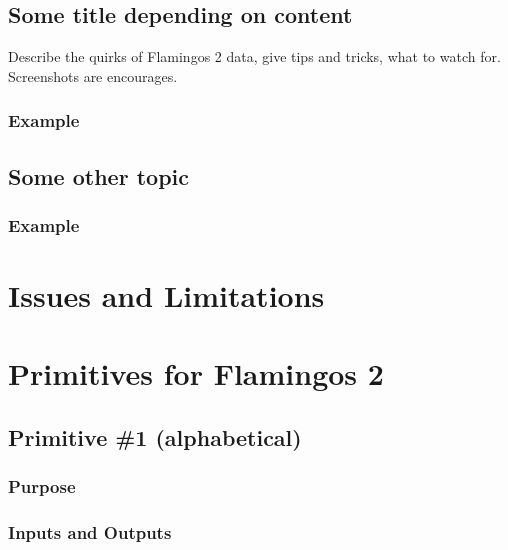 \documentclass[letterpaper,10pt,english]{sphinxmanual}
\begin{document}
\subsection{Some title depending on content}
\label{F2/tipstricks:some-title-depending-on-content}
Describe the quirks of Flamingos 2 data, give tips
and tricks, what to watch for.  Screenshots are encourages.


\subsubsection{Example}
\label{F2/tipstricks:example}

\subsection{Some other topic}
\label{F2/tipstricks:some-other-topic}

\subsubsection{Example}
\label{F2/tipstricks:id1}

\section{Issues and Limitations}
\label{F2/issueslimitations:f2-issues-limitations}\label{F2/issueslimitations::doc}\label{F2/issueslimitations:issues-and-limitations}

\section{Primitives for Flamingos 2}
\label{F2/primitives:f2-primitives}\label{F2/primitives::doc}\label{F2/primitives:primitives-for-flamingos-2}

\subsection{Primitive \#1  (alphabetical)}
\label{F2/primitives_pages/primitive1:primitive-1-alphabetical}\label{F2/primitives_pages/primitive1:f2-primitive-1}\label{F2/primitives_pages/primitive1::doc}

\subsubsection{Purpose}
\label{F2/primitives_pages/primitive1:purpose}

\subsubsection{Inputs and Outputs}
\label{F2/primitives_pages/primitive1:inputs-and-outputs}
\end{document}
